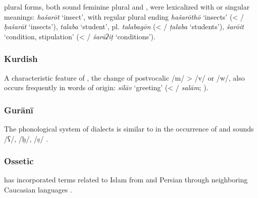 \documentclass[output=paper]{langsci/langscibook}
\begin{document}
 plural forms, both sound feminine plural and , were lexicalized with  or singular meanings: \textit{hašarōt} ‘insect’, with regular plural ending \textit{hašarōthō} ‘insects’ (< / \textit{ḥašarāt} ‘insects’), \textit{talaba} ‘student’, pl. \textit{talabagōn} (< / \textit{ṭalaba} ‘students’), \textit{šarōit} ‘condition, stipulation’ (< / \textit{šarāʔiṭ} ‘conditions’).


\subsubsection{Kurdish}

A characteristic feature of , the change of postvocalic /m/ > /v/ or /w/, also occurs frequently in words of  origin: \textit{silāv} ‘greeting’ (< / \textit{salām}; \citealt{Paul2008}).

\subsubsection{Gurānī}

The phonological system of  dialects is similar to  in the occurrence of   and  sounds /ʕ/, /ḥ/, /ṣ/ \citep{MacKenzie2012}.

\subsubsection{Ossetic}
 has incorporated terms related to Islam from  and Persian through neighboring Caucasian languages \citep{Thordarson2009}.
\end{document}
